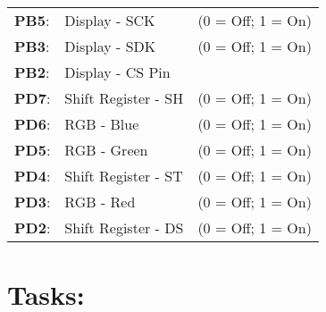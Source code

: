 \documentclass[12pt]{article}
\begin{document}
\begin{tabular}{ l l l }

   \textbf{PB5}: & Display - SCK & \quad (0 = Off; 1 = On) \\
   \textbf{PB3}: & Display - SDK & \quad (0 = Off; 1 = On) \\
   \textbf{PB2}: & Display - CS Pin \\
   \textbf{PD7}: & Shift Register - SH & \quad (0 = Off; 1 = On) \\
   \textbf{PD6}: & RGB - Blue & \quad (0 = Off; 1 = On) \\
   \textbf{PD5}: & RGB - Green & \quad (0 = Off; 1 = On) \\
   \textbf{PD4}: & Shift Register - ST  & \quad (0 = Off; 1 = On) \\
   \textbf{PD3}: & RGB - Red & \quad (0 = Off; 1 = On) \\
   \textbf{PD2}: & Shift Register - DS & \quad (0 = Off; 1 = On) \\
\end{tabular}

\pagebreak
\section{Tasks:}
\end{document}
